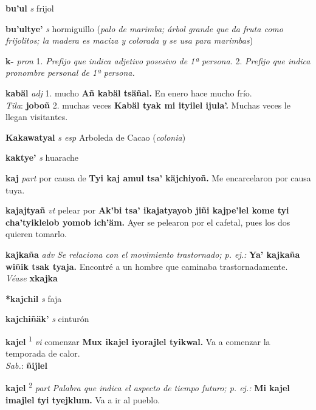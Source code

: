 \documentclass[10pt]{scrbook}
\newcommand{\entry}[1]{\textbf{#1}}
\newcommand{\alphaletter}[1]{\end{multicols}\addsec{#1}\begin{multicols}{2}}
\newcommand{\onedefinition}[1]{#1.}
\newcommand{\defsuperscript}[1]{\textsuperscript{#1}}
\newcommand{\nontranslationdef}[1]{\textit{#1}}
\newcommand{\partofspeech}[1]{\textit{#1}}
\newcommand{\spanishtranslation}[1]{#1}
\newcommand{\clarification}[1]{(\textit{#1})}
\newcommand{\cholexample}[1]{\textbf{#1}}
\newcommand{\exampletranslation}[1]{#1}
\newcommand{\dialectvariant}[1]{\\\textit{#1}:}
\newcommand{\dialectword}[1]{\textbf{#1}}
\newcommand{\alsosee}[1]{\\\textit{Véase} \textbf{#1}}
\begin{document}
\begin{multicols}{2}
\entry{bu'ul}
\partofspeech{s}
\spanishtranslation{frijol}

\entry{bu'ultye'}
\partofspeech{s}
\spanishtranslation{hormiguillo}
\clarification{palo de marimba; árbol grande que da fruta como frijolitos; la madera es maciza y colorada y se usa para marimbas}

\alphaletter{K}

\entry{k-}
\partofspeech{pron}
\onedefinition{1}
\nontranslationdef{Prefijo que indica adjetivo posesivo de 1ª persona.}
\onedefinition{2}
\nontranslationdef{Prefijo que indica pronombre personal de 1ª persona.}

\entry{kabäl}
\partofspeech{adj}
\onedefinition{1}
\spanishtranslation{mucho}
\cholexample{Añ kabäl tsäñal.}
\exampletranslation{En enero hace mucho frío.}
\dialectvariant{Tila}
\dialectword{joboñ}
\onedefinition{2}
\spanishtranslation{muchas veces}
\cholexample{Kabäl tyak mi ityilel ijula'.}
\exampletranslation{Muchas veces le llegan visitantes.}

\entry{Kakawatyal}
\partofspeech{s esp}
\spanishtranslation{Arboleda de Cacao}
\clarification{colonia}

\entry{kaktye'}
\partofspeech{s}
\spanishtranslation{huarache}

\entry{kaj}
\partofspeech{part}
\spanishtranslation{por causa de}
\cholexample{Tyi kaj amul tsa' käjchiyoñ.}
\exampletranslation{Me encarcelaron por causa tuya.}

\entry{kajajtyañ}
\partofspeech{vt}
\spanishtranslation{pelear por}
\cholexample{Ak'bi tsa' ikajatyayob jiñi kajpe'lel kome tyi cha'tyiklelob yomob ich'äm.}
\exampletranslation{Ayer se pelearon por el cafetal, pues los dos quieren tomarlo.}

\entry{kajkaña}
\partofspeech{adv}
\nontranslationdef{Se relaciona con el movimiento trastornado; p. ej.:}
\cholexample{Ya' kajkaña wiñik tsak tyaja.}
\exampletranslation{Encontré a un hombre que caminaba trastornadamente.}
\alsosee{xkajka}

\entry{*kajchil}
\partofspeech{s}
\spanishtranslation{faja}

\entry{kajchiñäk'}
\partofspeech{s}
\spanishtranslation{cinturón}

\entry{kajel}
\defsuperscript{1}
\partofspeech{vi}
\spanishtranslation{comenzar}
\cholexample{Mux ikajel iyorajlel tyikwal.}
\exampletranslation{Va a comenzar la temporada de calor.}
\dialectvariant{Sab.}
\dialectword{ñijlel}

\entry{kajel}
\defsuperscript{2}
\partofspeech{part}
\nontranslationdef{Palabra que indica el aspecto de tiempo futuro; p. ej.:}
\cholexample{Mi kajel imajlel tyi tyejklum.}
\exampletranslation{Va a ir al pueblo.}


\end{multicols}
\end{document}
